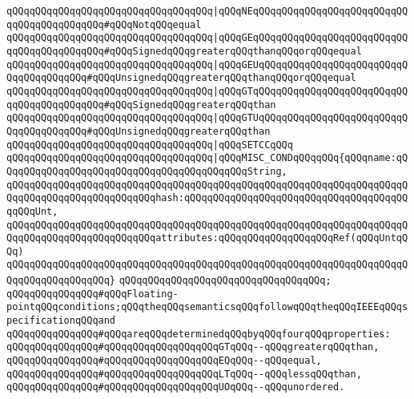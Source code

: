 \verb|qQQqqQQqqQQqqQQqqQQqqQQqqQQqqQQqqQQq|\verb#|qQQqNEqQQqqQQqqQQqqQQqqQQqqQQqqQQqqQQqqQQqqQQqqQQq#\verb|#qQQqNotqQQqequal|\newline
\verb|qQQqqQQqqQQqqQQqqQQqqQQqqQQqqQQqqQQq|\verb#|qQQqGEqQQqqQQqqQQqqQQqqQQqqQQqqQQqqQQqqQQqqQQqqQQq#\verb|#qQQqSignedqQQqgreaterqQQqthanqQQqorqQQqequal|\newline
\verb|qQQqqQQqqQQqqQQqqQQqqQQqqQQqqQQqqQQq|\verb#|qQQqGEUqQQqqQQqqQQqqQQqqQQqqQQqqQQqqQQqqQQqqQQq#\verb|#qQQqUnsignedqQQqgreaterqQQqthanqQQqorqQQqequal|\newline
\verb|qQQqqQQqqQQqqQQqqQQqqQQqqQQqqQQqqQQq|\verb#|qQQqGTqQQqqQQqqQQqqQQqqQQqqQQqqQQqqQQqqQQqqQQqqQQq#\verb|#qQQqSignedqQQqgreaterqQQqthan|\newline
\verb|qQQqqQQqqQQqqQQqqQQqqQQqqQQqqQQqqQQq|\verb#|qQQqGTUqQQqqQQqqQQqqQQqqQQqqQQqqQQqqQQqqQQqqQQq#\verb|#qQQqUnsignedqQQqgreaterqQQqthan|\newline
\verb|qQQqqQQqqQQqqQQqqQQqqQQqqQQqqQQqqQQq|\verb#|qQQqSETCCqQQq#\newline
\verb|qQQqqQQqqQQqqQQqqQQqqQQqqQQqqQQqqQQq|\verb#|qQQqMISC_CONDqQQqqQQq{qQQqname:qQQqqQQqqQQqqQQqqQQqqQQqqQQqqQQqqQQqqQQqqQQqString,#\newline
\verb|qQQqqQQqqQQqqQQqqQQqqQQqqQQqqQQqqQQqqQQqqQQqqQQqqQQqqQQqqQQqqQQqqQQqqQQqqQQqqQQqqQQqqQQqqQQqqQQqhash:qQQqqQQqqQQqqQQqqQQqqQQqqQQqqQQqqQQqqQQqqQQqUnt,|\newline
\verb|qQQqqQQqqQQqqQQqqQQqqQQqqQQqqQQqqQQqqQQqqQQqqQQqqQQqqQQqqQQqqQQqqQQqqQQqqQQqqQQqqQQqqQQqqQQqqQQqattributes:qQQqqQQqqQQqqQQqqQQqRef(qQQqUntqQQq)|\newline
\verb|qQQqqQQqqQQqqQQqqQQqqQQqqQQqqQQqqQQqqQQqqQQqqQQqqQQqqQQqqQQqqQQqqQQqqQQqqQQqqQQqqQQqqQQq}|\newline
\verb|qQQqqQQqqQQqqQQqqQQqqQQqqQQqqQQqqQQq;|\newline
\newline
\verb|qQQqqQQqqQQqqQQq#qQQqFloating-pointqQQqconditions;qQQqtheqQQqsemanticsqQQqfollowqQQqtheqQQqIEEEqQQqspecificationqQQqand|\newline
\verb|qQQqqQQqqQQqqQQq#qQQqareqQQqdeterminedqQQqbyqQQqfourqQQqproperties:|\newline
\verb|qQQqqQQqqQQqqQQq#qQQqqQQqqQQqqQQqqQQqGTqQQq--qQQqgreaterqQQqthan,|\newline
\verb|qQQqqQQqqQQqqQQq#qQQqqQQqqQQqqQQqqQQqEQqQQq--qQQqequal,|\newline
\verb|qQQqqQQqqQQqqQQq#qQQqqQQqqQQqqQQqqQQqLTqQQq--qQQqlessqQQqthan,|\newline
\verb|qQQqqQQqqQQqqQQq#qQQqqQQqqQQqqQQqqQQqUOqQQq--qQQqunordered.|\newline
